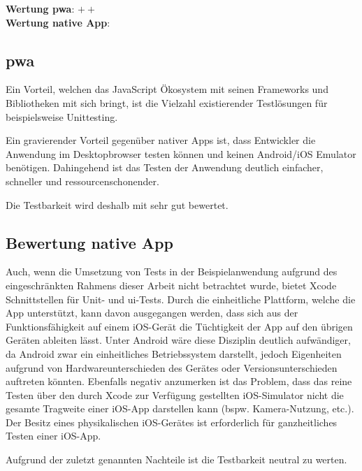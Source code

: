 \textbf{Wertung \ac{pwa}}: $++$\\
\textbf{Wertung native App}: \Circle \\

\subsection{\ac{pwa}}
Ein Vorteil, welchen das JavaScript Ökosystem mit seinen Frameworks und Bibliotheken mit sich bringt, ist die Vielzahl existierender Testlösungen für beispielsweise Unittesting.

Ein gravierender Vorteil gegenüber nativer Apps ist, dass Entwickler die Anwendung im Desktopbrowser testen können und keinen Android/iOS Emulator benötigen. Dahingehend ist das Testen der Anwendung deutlich einfacher, schneller und ressourcenschonender.

Die Testbarkeit wird deshalb mit sehr gut bewertet.

\subsection{Bewertung native App}
Auch, wenn die Umsetzung von Tests in der Beispielanwendung aufgrund des eingeschränkten Rahmens dieser Arbeit nicht betrachtet wurde, bietet Xcode Schnittstellen für Unit- und \ac{ui}-Tests. Durch die einheitliche Plattform, welche die App unterstützt, kann davon ausgegangen werden, dass sich aus der Funktionsfähigkeit auf einem iOS-Gerät die Tüchtigkeit der App auf den übrigen Geräten ableiten lässt. Unter Android wäre diese Disziplin deutlich aufwändiger, da Android zwar ein einheitliches Betriebssystem darstellt, jedoch Eigenheiten aufgrund von Hardwareunterschieden des Gerätes oder Versionsunterschieden auftreten könnten. Ebenfalls negativ anzumerken ist das Problem, dass das reine Testen über den durch Xcode zur Verfügung gestellten iOS-Simulator nicht die gesamte Tragweite einer iOS-App darstellen kann (bspw. Kamera-Nutzung, etc.). Der Besitz eines physikalischen iOS-Gerätes ist erforderlich für ganzheitliches Testen einer iOS-App.

Aufgrund der zuletzt genannten Nachteile ist die Testbarkeit neutral zu werten.